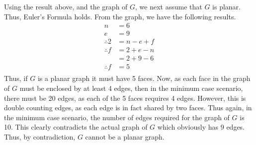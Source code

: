 \documentclass[a4paper]{article}
\begin{document}
\begin{enumerate}[label=\textbf{\arabic*.}]
\begin{enumerate}
		Using the result above, and the graph of $\displaystyle{G}$, we next assume that $\displaystyle{G}$ is planar. Thus, Euler's Formula holds. From the graph, we have the following results.
		\begin{align*}
		n & = 6\\
		e & = 9\\
		\therefore 2 & = n - e + f\\
		\therefore f & = 2 + e - n\\
		& = 2 + 9 - 6\\
		\therefore f & = 5\\ 
		\end{align*}
		Thus, if $\displaystyle{G}$ is a planar graph it must have 5 faces. Now, as each face in the graph of $\displaystyle{G}$ must be enclosed by at least 4 edges, then in the minimum case scenario, there must be 20 edges, as each of the 5 faces requires 4 edges. However, this is double counting edges, as each edge is in fact shared by two faces. Thus again, in the minimum case scenario, the number of edges required for the graph of $\displaystyle{G}$ is 10. This clearly contradicts the actual graph of $\displaystyle{G}$ which obviously has 9 edges. Thus, by contradiction, $\displaystyle{G}$ cannot be a planar graph.

	\end{enumerate}

	\bigbreak


\end{enumerate}
\end{document}
